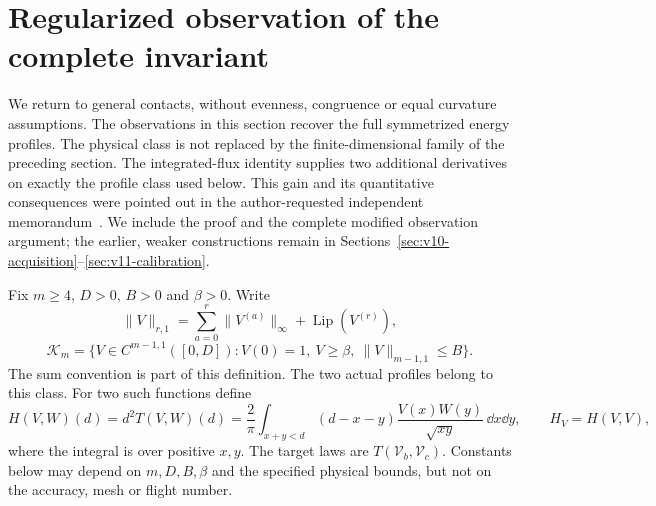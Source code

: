 \section{Regularized observation of the complete invariant}
\label{sec:v12-regularized-observation}
We return to general contacts, without evenness, congruence or equal
curvature assumptions. The observations in this section recover the
full symmetrized energy profiles. The physical class is not replaced
by the finite-dimensional family of the preceding section.
The integrated-flux identity supplies two additional derivatives on
exactly the profile class used below. This gain and its quantitative
consequences were pointed out in the author-requested independent
memorandum~\cite{A2ReviewV11}. We include the proof and the complete
modified observation argument; the earlier, weaker constructions
remain in Sections~\ref{sec:v10-acquisition}--\ref{sec:v11-calibration}.

Fix $m\ge4$, $D>0$, $B>0$ and $\beta>0$. Write
\[
 \|V\|_{r,1}=\sum_{a=0}^r\|V^{(a)}\|_\infty+
                         \operatorname{Lip}(V^{(r)}),
\]
\[
 \mathcal K_m=\{V\in C^{m-1,1}([0,D]):
      V(0)=1,\ V\ge\beta,\ \|V\|_{m-1,1}\le B\}.
\]
The sum convention is part of this definition. The two actual profiles
belong to this class. For two such functions define
\[
 H(V,W)(d)=d^2T(V,W)(d)
   =\frac2\pi\int_{x+y<d}(d-x-y)
                  \frac{V(x)W(y)}{\sqrt{xy}}\,\dd x\dd y,
 \qquad H_V=H(V,V),
\]
where the integral is over positive $x,y$. The target laws are
$T(\mathcal V_b,\mathcal V_c)$. Constants below may depend on
$m,D,B,\beta$ and the specified physical bounds, but not on the
accuracy, mesh or flight number.


